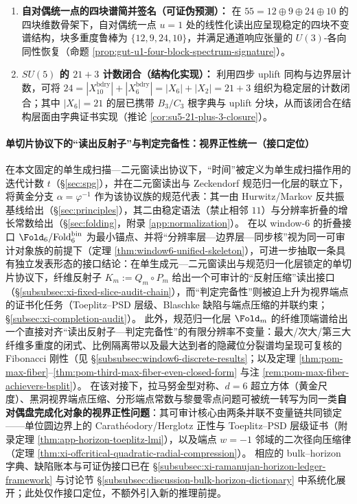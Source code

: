 \begin{theorem}
\begin{enumerate}
  \item \textbf{自对偶统一点的四块谱简并签名（可证伪预测）：}
  在 \(55=12\oplus 9\oplus 24\oplus 10\) 的四块维数骨架下，自对偶统一点 \(u=1\) 处的线性化读出应呈现稳定的四块不变谱结构，块多重度鲁棒为 \(\{12,9,24,10\}\)，并满足通道响应张量的 \(U(3)\)-各向同性恢复（命题 \ref{prop:gut-u1-four-block-spectrum-signature}）。

  \item \textbf{\texorpdfstring{$SU(5)$}{SU(5)} 的 \(21+3\) 计数闭合（结构化实现）：}
  利用四步 uplift 同构与边界层计数，可将
  \(
  24=|X_{10}^{\mathrm{bdry}}|+|X_6^{\mathrm{bdry}}|
  =|X_6|+|X_2|=21+3
  \)
  组织为稳定层的计数闭合；其中 \(|X_6|=21\) 的层已携带 \(B_3/C_3\) 根字典与 uplift 分块，从而该闭合在结构层面由字典证书实现（推论 \ref{cor:su5-21-plus-3-closure}）。
\end{enumerate}
\end{theorem}

\paragraph{单切片协议下的“读出反射子”与判定完备性：视界正性统一（接口定位）}
在本文固定的单生成扫描—二元窗读出协议下，“时间”被定义为单生成扫描作用的迭代计数 \(t\)（\S\ref{sec:spg}），并在二元窗读出与 Zeckendorf 规范归一化层的联立下，将黄金分支 \(\alpha=\varphi^{-1}\) 作为该协议族的规范代表：其一由 Hurwitz/Markov 反共振基线给出（\S\ref{sec:principles}），其二由稳定语法（禁止相邻 \(11\)）与分辨率折叠的增长常数给出（\S\ref{sec:folding}，附录 \ref{app:normalization}）。
在以 window-\(6\) 的折叠接口 \(\Fold_6/\mathrm{Fold}^{\mathrm{bin}}_6\) 为最小锚点、并将“分辨率层—边界层—同步核”视为同一可审计对象族的前提下（定理 \ref{thm:window6-unified-skeleton}），可进一步抽取一条具有独立发表形态的接口结论：在单生成元—二元窗读出与规范归一化层锁定的单切片协议下，纤维反射子 \(K_m:=Q_m\circ P_m\) 给出一个可审计的“反射压缩”读出接口（\S\ref{subsubsec:xi-fixed-slice-audit-chain}），而“判定完备性”则被迫上升为视界端点的证书化任务（Toeplitz--PSD 层级、Blaschke 缺陷与端点压缩的并联约束；\S\ref{subsec:xi-completion-audit}）。
此外，规范归一化层 \(\Fold_m\) 的纤维顶端谱给出一个直接对齐“读出反射子—判定完备性”的有限分辨率不变量：最大/次大/第三大纤维多重度的闭式、比例隔离带以及最大达到者的隐藏位分裂谱均呈现可复核的 Fibonacci 刚性（见 \S\ref{subsubsec:window6-discrete-results}；以及定理 \ref{thm:pom-max-fiber}--\ref{thm:pom-third-max-fiber-even-closed-form} 与注 \ref{rem:pom-max-fiber-achievers-bsplit}）。
在该对接下，拉马努金型对称、\(d=6\) 超立方体（黄金尺度）、黑洞视界端点压缩、分形端点常数与黎曼零点问题可被统一转写为同一类\textbf{自对偶盘完成化对象的视界正性问题}：其可审计核心由两条并联不变量链共同锁定——单位圆边界上的 Carath\'eodory/Herglotz 正性与 Toeplitz--PSD 层级证书（附录定理 \ref{thm:app-horizon-toeplitz-lmi}），以及端点 \(w=-1\) 邻域的二次径向压缩律（定理 \ref{thm:xi-offcritical-quadratic-radial-compression}）。
相应的 bulk--horizon 字典、缺陷账本与可证伪接口已在 \S\ref{subsubsec:xi-ramanujan-horizon-ledger-framework} 与讨论节 \S\ref{subsubsec:discussion-bulk-horizon-dictionary} 中系统化展开；此处仅作接口定位，不额外引入新的推理前提。

